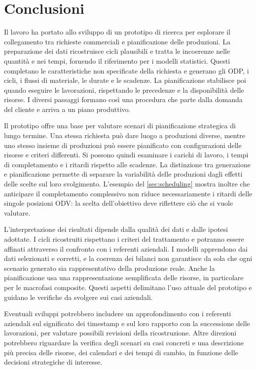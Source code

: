 \chapter{Conclusioni}
\label{sec:conclusions}

Il lavoro ha portato allo sviluppo di un prototipo di ricerca per esplorare il collegamento tra richieste commerciali e pianificazione delle produzioni. La preparazione dei dati ricostruisce cicli plausibili e tratta le incoerenze nelle quantità e nei tempi, fornendo il riferimento per i modelli statistici. Questi completano le caratteristiche non specificate della richiesta e generano gli ODP, i cicli, i flussi di materiale, le durate e le scadenze. La pianificazione stabilisce poi quando eseguire le lavorazioni, rispettando le precedenze e la disponibilità delle risorse. I diversi passaggi formano così una procedura che parte dalla domanda del cliente e arriva a un piano produttivo.

Il prototipo offre una base per valutare scenari di pianificazione strategica di lungo termine. Una stessa richiesta può dare luogo a produzioni diverse, mentre uno stesso insieme di produzioni può essere pianificato con configurazioni delle risorse e criteri differenti. Si possono quindi esaminare i carichi di lavoro, i tempi di completamento e i ritardi rispetto alle scadenze. La distinzione tra generazione e pianificazione permette di separare la variabilità delle produzioni dagli effetti delle scelte sul loro svolgimento. L'esempio del \cref{sec:scheduling} mostra inoltre che anticipare il completamento complessivo non riduce necessariamente i ritardi delle singole posizioni ODV: la scelta dell'obiettivo deve riflettere ciò che si vuole valutare.

L'interpretazione dei risultati dipende dalla qualità dei dati e dalle ipotesi adottate. I cicli ricostruiti rispettano i criteri del trattamento e potranno essere affinati attraverso il confronto con i referenti aziendali. I modelli apprendono dai dati selezionati e corretti, e la coerenza dei bilanci non garantisce da sola che ogni scenario generato sia rappresentativo della produzione reale. Anche la pianificazione usa una rappresentazione semplificata delle risorse, in particolare per le macrofasi composite. Questi aspetti delimitano l'uso attuale del prototipo e guidano le verifiche da svolgere sui casi aziendali.

Eventuali sviluppi potrebbero includere un approfondimento con i referenti aziendali sul significato dei timestamp e sul loro rapporto con la successione delle lavorazioni, per valutare possibili revisioni della ricostruzione. Altre direzioni potrebbero riguardare la verifica degli scenari su casi concreti e una descrizione più precisa delle risorse, dei calendari e dei tempi di cambio, in funzione delle decisioni strategiche di interesse.
